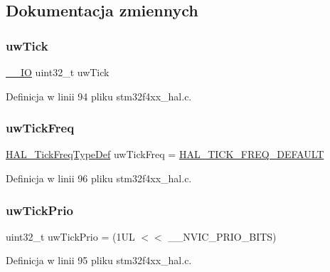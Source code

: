 \subsection{Dokumentacja zmiennych}
\mbox{\label{group___h_a_l___private___variables_ga9d411ea525781e633bf7ea7ef2f90728}} 
\subsubsection{\texorpdfstring{uw\+Tick}{uwTick}}
{\footnotesize\ttfamily \hyperlink{core__sc300_8h_aec43007d9998a0a0e01faede4133d6be}{\+\_\+\+\_\+\+IO} uint32\+\_\+t uw\+Tick}



Definicja w linii 94 pliku stm32f4xx\+\_\+hal.\+c.

\mbox{\label{group___h_a_l___private___variables_ga84a0c55c4d0bff06a085b4fcfd6531cd}} 
\subsubsection{\texorpdfstring{uw\+Tick\+Freq}{uwTickFreq}}
{\footnotesize\ttfamily \hyperlink{group___h_a_l___t_i_c_k___f_r_e_q_gab36ec81674817249c46734772ff3b73a}{H\+A\+L\+\_\+\+Tick\+Freq\+Type\+Def} uw\+Tick\+Freq = \hyperlink{group___h_a_l___t_i_c_k___f_r_e_q_ggab36ec81674817249c46734772ff3b73aa94e043d780eb1c36291338f6d6314e42}{H\+A\+L\+\_\+\+T\+I\+C\+K\+\_\+\+F\+R\+E\+Q\+\_\+\+D\+E\+F\+A\+U\+LT}}



Definicja w linii 96 pliku stm32f4xx\+\_\+hal.\+c.

\mbox{\label{group___h_a_l___private___variables_ga3000c5e83924ed2debb1849c738d4be2}} 
\subsubsection{\texorpdfstring{uw\+Tick\+Prio}{uwTickPrio}}
{\footnotesize\ttfamily uint32\+\_\+t uw\+Tick\+Prio = (1\+U\+L $<$$<$ \+\_\+\+\_\+\+N\+V\+I\+C\+\_\+\+P\+R\+I\+O\+\_\+\+B\+I\+T\+S)}



Definicja w linii 95 pliku stm32f4xx\+\_\+hal.\+c.

